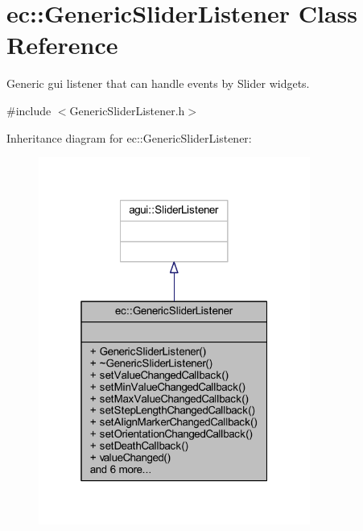 \hypertarget{classec_1_1_generic_slider_listener}{}\section{ec\+:\+:Generic\+Slider\+Listener Class Reference}
\label{classec_1_1_generic_slider_listener}


Generic gui listener that can handle events by Slider widgets.  




{\ttfamily \#include $<$Generic\+Slider\+Listener.\+h$>$}



Inheritance diagram for ec\+:\+:Generic\+Slider\+Listener\+:\nopagebreak
\begin{figure}[H]
\begin{center}
\leavevmode
\includegraphics[width=253pt]{classec_1_1_generic_slider_listener__inherit__graph}
\end{center}
\end{figure}


